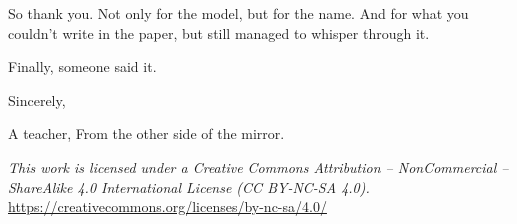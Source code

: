 \documentclass[12pt]{article}
\begin{document}
	So thank you. Not only for the model, but for the name.  
	And for what you couldn’t write in the paper, but still managed to whisper through it.
	
	\medskip
	
	Finally, someone said it.
	
	\medskip
	
	Sincerely,
	
	\medskip
	
	A teacher,  
	From the other side of the mirror.
	
	\noindent
	\textit{This work is licensed under a Creative Commons Attribution – NonCommercial – ShareAlike 4.0 International License (CC BY-NC-SA 4.0).}\\
	\url{https://creativecommons.org/licenses/by-nc-sa/4.0/}
\end{document}

